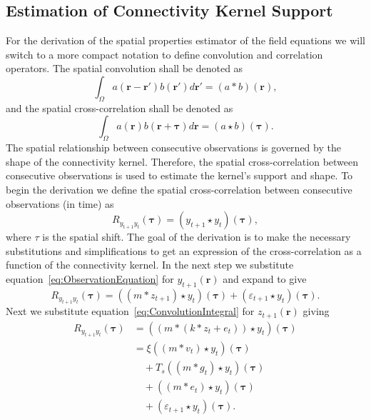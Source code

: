 \documentclass[draftcls,onecolumn]{IEEEtran}
\begin{document}
\subsection{Estimation of Connectivity Kernel Support}
For the derivation of the spatial properties estimator of the field equations we will switch to a more compact notation to define convolution and correlation operators. The spatial convolution shall be denoted as
\begin{equation}
	\int_\Omega a(\mathbf{r}-\mathbf{r}')b(\mathbf{r}')d\mathbf{r}' = (a\ast b)(\mathbf{r}),
\end{equation}
and the spatial cross-correlation shall be denoted as 
\begin{equation}
	\int_\Omega a(\mathbf{r})b(\mathbf{r}+\boldsymbol{\tau})d\mathbf{r} = (a\star b)(\boldsymbol{\tau}).
\end{equation} 
The spatial relationship between consecutive observations is governed by the shape of the connectivity kernel. Therefore, the spatial cross-correlation between consecutive observations is used to estimate the kernel's support and shape. To begin the derivation we define the spatial cross-correlation between consecutive observations (in time) as
\begin{equation}
	R_{y_{t+1}y_t}(\boldsymbol{\tau}) = \left(y_{t+1}\star y_t\right)\left(\boldsymbol{\tau}\right),
\end{equation}
where $\tau$ is the spatial shift. The goal of the derivation is to make the necessary substitutions and simplifications to get an expression of the cross-correlation as a function of the connectivity kernel. In the next step we substitute equation~\ref{eq:ObservationEquation} for $y_{t+1}(\mathbf{r})$ and expand to give
\begin{equation}
	R_{y_{t+1}y_t}\left(\boldsymbol{\tau}\right) = \left(\left(m \ast z_{t+1}\right)\star y_t\right)\left(\boldsymbol{\tau}\right) + \left(\varepsilon_{t+1} \star y_t\right)\left(\boldsymbol{\tau}\right).
\end{equation}
Next we substitute equation~\ref{eq:ConvolutionIntegral} for $z_{t+1}(\mathbf{r})$ giving 
\begin{align}
	R_{y_{t+1}y_t}(\boldsymbol{\tau}) &= (\left(m \ast \left(k\ast z_t + e_t\right)\right) \star y_t)(\boldsymbol{\tau})\\
	&= \xi\left(\left(m \ast v_t\right) \star y_t \right)(\boldsymbol{\tau}) \nonumber\\
	&\quad+ T_s \left(\left(m\ast g_t\right)\star y_t \right)(\boldsymbol{\tau}) \nonumber\\
	&\quad+ \left(\left(m\ast e_t\right)\star y_t \right)(\boldsymbol{\tau}) \nonumber\\
	&\quad+ (\varepsilon_{t+1} \star y_t)(\boldsymbol{\tau}).
\end{align}
\end{document}
